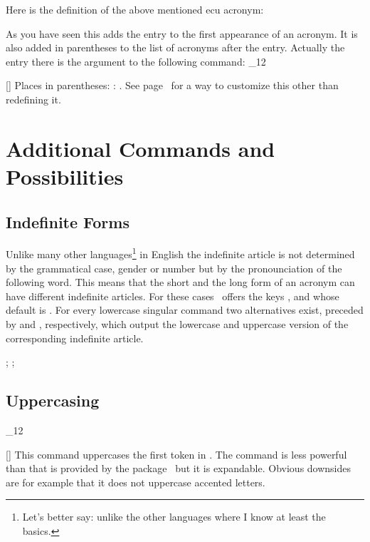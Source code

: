 \documentclass[load-preamble+]{cnltx-doc}
\makeatletter
\renewenvironment{commands}
  {%
    \cnltx@set@catcode_{12}%
    \let\command\cnltx@command
    \cnltxlist
  }
  {\endcnltxlist}
\makeatother
\begin{document}
Here is the definition of the above mentioned \ac{ecu} acronym:
\begin{sourcecode}
\end{sourcecode}
As you have seen this adds the  entry to the first appearance
of an acronym.  It is also added in parentheses to the list of acronyms after
the  entry.  Actually the entry there is the argument to the
following command:
\begin{commands}
  \command{acroenparen}[]
    Places  in parentheses: :
    .  See page~\pageref{key:list-foreign-format} for a
    way to customize this other than redefining it.
\end{commands}

\section{Additional Commands and Possibilities}
\subsection{Indefinite Forms}

Unlike many other languages\footnote{Let's better say: unlike the other
  languages where I know at least the basics.} in English the indefinite
article is not determined by the grammatical case, gender or number but by the
pronounciation of the following word.  This means that the short and the long
form of an acronym can have different indefinite articles.  For these cases
\acro\ offers the keys ,  and
 whose default is .  For every lowercase
singular command two alternatives exist, preceded by  and ,
respectively, which output the lowercase and uppercase version of the
corresponding indefinite article.

\begin{example}
  ; ; 
\end{example}

\subsection{Uppercasing}
\begin{commands}
  \command{acfirstupper}[]
     This command uppercases the first token in .  The
     command is less powerful than  that is provided by the
      package~\cite{pkg:mfirstuc} but it is expandable.  Obvious
     downsides are for example that it does not uppercase accented letters.
\end{commands}
\end{document}
